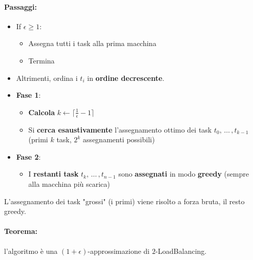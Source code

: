 \documentclass[11pt]{article}
\begin{document}
	\paragraph{Passaggi:}
	\begin{itemize}
		\item If $\epsilon \geq 1$: 
		\begin{itemize}
			\item Assegna tutti i task alla prima macchina 
			\item Termina
		\end{itemize}
		\nn
		
		\item Altrimenti, ordina i $t_i$ in \textbf{ordine decrescente}.\\
		
		\item \textbf{Fase 1}:
		\begin{itemize}
			\item \textbf{Calcola} $k \leftarrow \lceil \frac{1}{\epsilon} -1 \rceil$
			\item Si \textbf{cerca esaustivamente} l'assegnamento ottimo dei task $t_0, \, \dots \, , t_{k-1}$ (primi $k$ task, $2^k$ assegnamenti possibili)
		\end{itemize}
		\nn
		
		\item \textbf{Fase 2}:
		\begin{itemize}
			\item I \textbf{restanti task}  $t_k, \, \dots \, , t_{n-1}$ sono \textbf{assegnati} in modo \textbf{greedy} (sempre alla macchina più scarica)
		\end{itemize}
		\nn
	\end{itemize}
	
	L'assegnamento dei task "grossi" (i primi) viene risolto a forza bruta, il resto greedy.\\
	
	\paragraph{Teorema:} l'algoritmo è una $(1+ \epsilon)$-approssimazione di $2$-LoadBalancing.\\
	
\end{document}
